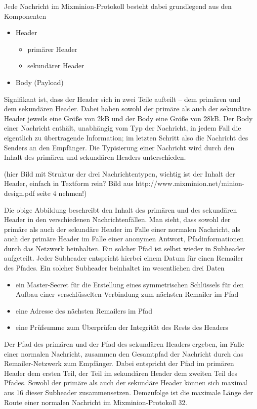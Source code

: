 Jede Nachricht im Mixminion-Protokoll besteht dabei grundlegend aus den Komponenten 
\begin{itemize}
\item Header
	\begin{itemize}
	\item primärer Header
	\item sekundärer Header
	\end{itemize}
\item Body (Payload)
\end{itemize}

Signifikant ist, dass der Header sich in zwei Teile aufteilt -- dem primären und dem sekundären Header. Dabei haben sowohl der primäre als auch der sekundäre Header jeweils eine Größe von 2kB und der Body eine Größe von 28kB. Der Body einer Nachricht enthält, unabhängig vom Typ der Nachricht, in jedem Fall die eigentlich zu übertragende Information; im letzten Schritt also die Nachricht des Senders an den Empfänger. Die Typisierung einer Nachricht wird durch den Inhalt des primären und sekundären Headers unterschieden.

(hier Bild mit Struktur der drei Nachrichtentypen, wichtig ist der Inhalt der Header, einfach in Textform rein? Bild aus http://www.mixminion.net/minion-design.pdf seite 4 nehmen!)

Die obige Abbildung beschreibt den Inhalt des primären und des sekundären Header in den verschiedenen Nachrichtenfällen.
Man sieht, dass sowohl der primäre als auch der sekundäre Header im Falle einer normalen Nachricht, als auch der primäre Header im Falle einer anonymen Antwort, Pfadinformationen durch das Netzwerk beinhalten.
Ein solcher Pfad ist selbst wieder in Subheader aufgeteilt. Jeder Subheader entspricht hierbei einem Datum für einen Remailer des Pfades. Ein solcher Subheader beinhaltet im wesentlichen drei Daten
\begin{itemize}
\item ein Master-Secret für die Erstellung eines symmetrischen Schlüssels für den Aufbau einer verschlüsselten Verbindung zum nächsten Remailer im Pfad
\item eine Adresse des nächsten Remailers im Pfad
\item eine Prüfsumme zum Überprüfen der Integrität des Rests des Headers
\end{itemize}
Der Pfad des primären und der Pfad des sekundären Headers ergeben, im Falle einer normalen Nachricht, zusammen den Gesamtpfad der Nachricht durch das Remailer-Netzwerk zum Empfänger. Dabei entspricht der Pfad im primären Header dem ersten Teil, der Teil im sekundären Header dem zweiten Teil des Pfades.
Sowohl der primäre als auch der sekundäre Header können sich maximal aus 16 dieser Subheader zusammensetzen. Demzufolge ist die maximale Länge der Route einer normalen Nachricht im Mixminion-Protokoll 32.

